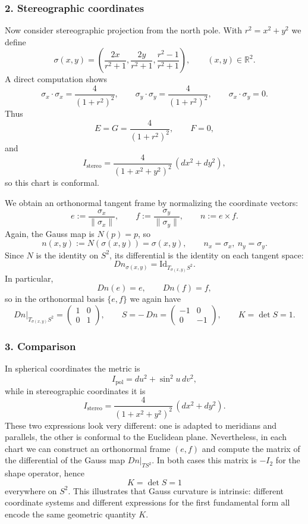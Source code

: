 \documentclass[12pt,a4paper]{article}
\theoremstyle{plain}
\theoremstyle{definition}      %
\begin{document}
\subsubsection*{2. Stereographic coordinates}

Now consider stereographic projection from the north pole.  With
$r^2 = x^2 + y^2$ we define
\[
\sigma(x,y)
=
\left(
\frac{2x}{r^2 + 1},
\frac{2y}{r^2 + 1},
\frac{r^2 - 1}{r^2 + 1}
\right),
\qquad (x,y)\in\mathbb{R}^2.
\]
A direct computation shows
\[
\sigma_x\cdot\sigma_x
= \frac{4}{(1+r^2)^2},\qquad
\sigma_y\cdot\sigma_y
= \frac{4}{(1+r^2)^2},\qquad
\sigma_x\cdot\sigma_y = 0.
\]
Thus
\[
E = G = \frac{4}{(1+r^2)^2},\qquad F = 0,
\]
and
\[
I_{\mathrm{stereo}}
= \frac{4}{(1+x^2 + y^2)^2}\,(dx^2 + dy^2),
\]
so this chart is conformal.

We obtain an orthonormal tangent frame by normalizing the coordinate vectors:
\[
e := \frac{\sigma_x}{\|\sigma_x\|},\qquad
f := \frac{\sigma_y}{\|\sigma_y\|},\qquad
n := e\times f.
\]
Again, the Gauss map is $N(p)=p$, so
\[
n(x,y) := N(\sigma(x,y)) = \sigma(x,y),\qquad
n_x = \sigma_x,\ n_y = \sigma_y.
\]
Since $N$ is the identity on $S^2$, its differential is the identity on each
tangent space:
\[
Dn_{\sigma(x,y)} = \mathrm{Id}_{T_{\sigma(x,y)}S^2}.
\]
In particular,
\[
Dn(e) = e,\qquad Dn(f) = f,
\]
so in the orthonormal basis $\{e,f\}$ we again have
\[
Dn|_{T_{\sigma(x,y)}S^2}
=
\begin{pmatrix}
	1 & 0\\
	0 & 1
\end{pmatrix},
\qquad
S = -\,Dn
=
\begin{pmatrix}
	-1 & 0\\
	0 & -1
\end{pmatrix},
\qquad
K = \det S = 1.
\]

\subsubsection*{3. Comparison}

In spherical coordinates the metric is
\[
I_{\mathrm{pol}} = du^2 + \sin^2 u\,dv^2,
\]
while in stereographic coordinates it is
\[
I_{\mathrm{stereo}}
= \frac{4}{(1+x^2 + y^2)^2}\,(dx^2 + dy^2).
\]
These two expressions look very different: one is adapted to meridians and
parallels, the other is conformal to the Euclidean plane.  Nevertheless, in
each chart we can construct an orthonormal frame $(e,f)$ and compute the
matrix of the differential of the Gauss map $Dn|_{T S^2}$.  In both cases this
matrix is $-I_{2}$ for the shape operator, hence
\[
K = \det S = 1
\]
everywhere on $S^2$.  This illustrates that Gauss curvature is intrinsic:
different coordinate systems and different expressions for the first
fundamental form all encode the same geometric quantity $K$.


	
	
\end{document}
